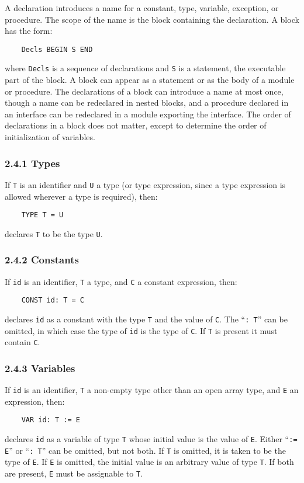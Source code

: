 \documentclass[10pt]{article}
\begin{document}
A declaration introduces a name for a constant, type, variable, exception, or
procedure.  The scope of the name is the block containing the declaration.  A
block has the form:
\begin{verbatim}
    Decls BEGIN S END
\end{verbatim}
where \verb|Decls| is a sequence of declarations and \verb|S| is a statement,
the executable part of the block.  A block can appear as a statement or as the
body of a module or procedure.  The declarations of a block can introduce a
name at most once, though a name can be redeclared in nested blocks, and a
procedure declared in an interface can be redeclared in a module exporting the
interface.  The order of declarations in a block does not matter, except to
determine the order of initialization of variables.

\subsubsection*{2.4.1 Types}

If \verb|T| is an identifier and \verb|U| a type (or type expression, since a
type expression is allowed wherever a type is required), then:
\begin{verbatim}
    TYPE T = U
\end{verbatim}
declares \verb|T| to be the type \verb|U|.

\subsubsection*{2.4.2 Constants}

If \verb|id| is an identifier, \verb|T| a type, and \verb|C| a constant
expression, then:
\begin{verbatim}
    CONST id: T = C
\end{verbatim}
declares \verb|id| as a constant with the type \verb|T| and the value of
\verb|C|.  The ``\verb|: T|'' can be omitted, in which case the type of
\verb|id| is the type of \verb|C|.  If \verb|T| is present it must contain
\verb|C|.

\subsubsection*{2.4.3 Variables}

If \verb|id| is an identifier, \verb|T| a non-empty type other than an open
array type, and \verb|E| an expression, then:
\begin{verbatim}
    VAR id: T := E
\end{verbatim}
declares \verb|id| as a variable of type \verb|T| whose initial value is the
value of \verb|E|.  Either ``\verb|:= E|'' or ``\verb|: T|'' can be omitted,
but not both.  If \verb|T| is omitted, it is taken to be the type of \verb|E|.
If \verb|E| is omitted, the initial value is an arbitrary value of type
\verb|T|.  If both are present, \verb|E| must be assignable to \verb|T|.
\end{document}

